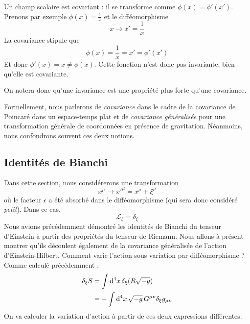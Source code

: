 \begin{exmp}
    Un champ scalaire est covariant : il se transforme comme $\phi(x) = \phi'(x')$. Prenons par exemple $\phi(x) = \frac{1}{x}$ et le difféomorphisme
    \begin{equation}
        x \to x' = \frac{1}{x}
    \end{equation}
    La covariance stipule que
    \begin{equation}
        \phi(x) = \frac{1}{x} = x' = \phi'(x')
    \end{equation}
    Et donc $\phi'(x) = x \neq \phi(x)$. Cette fonction n'est donc pas invariante, bien qu'elle est covariante.
\end{exmp}
On notera donc qu'une invariance est une propriété plus forte qu'une covariance.
\begin{rmk}
    Formellement, nous parlerons de \emph{covariance} dans le cadre de la covariance de Poincaré dans un espace-temps plat et de \emph{covariance généralisée} pour une transformation générale de coordonnées en présence de gravitation. Néanmoins, nous confondrons souvent ces deux notions.
\end{rmk}
\subsection{Identités de Bianchi}
\label{sec:bianchi}
Dans cette section, nous considérerons une transformation 
\begin{equation}
    x^\mu \to x'^\mu = x^\mu + \xi^\mu
\end{equation}
où le facteur $\epsilon$ a été absorbé dans le difféomorphisme (qui sera donc considéré \emph{petit}). Dans ce cas,
\begin{equation}
    \mathcal{L}_\xi = \delta_\xi 
\end{equation}
Nous avions précédemment démontré les identités de Bianchi du tenseur d'Einstein à partir des propriétés du tenseur de Riemann. Nous allons à présent montrer qu'ils découlent également de la covariance généralisée de l'action d'Einstein-Hilbert. Comment varie l'action sous variation par difféomorphisme ? Comme calculé précédemment :
\begin{align}
    \delta_{\xi}S &= \int \mathrm{d}^4 x \, \delta_{\xi}(R\sqrt{-g}) \\
    &= -\int \mathrm{d}^4 x \, \sqrt{-g}\, G^{\mu \nu}\delta_{\xi}g_{\mu \nu}
\end{align}
On va calculer la variation d'action à partir de ces deux expressions différentes. 
